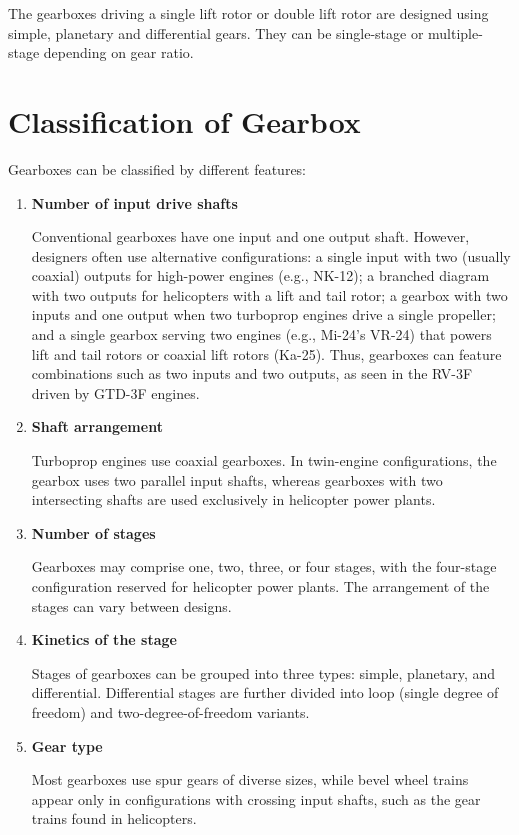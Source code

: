     The gearboxes driving a single lift rotor or double lift rotor are designed using simple, planetary and 
    differential gears. They can be single-stage or multiple-stage depending on gear ratio.

\section{Classification of Gearbox}
    Gearboxes can be classified by different features: 
		\begin{enumerate}
			\item \textbf{Number of input drive shafts}\par
            Conventional gearboxes have one input and one output shaft. However, designers often use alternative 
            configurations: a single input with two (usually coaxial) outputs for high-power engines (e.g., NK-12); 
            a branched diagram with two outputs for helicopters with a lift and tail rotor; a gearbox with two 
            inputs and one output when two turboprop engines drive a single propeller; and a single gearbox serving 
            two engines (e.g., Mi-24's VR-24) that powers lift and tail rotors or coaxial lift rotors (Ka-25). 
            Thus, gearboxes can feature combinations such as two inputs and two outputs, as seen in the RV-3F 
            driven by GTD-3F engines.
			\item \textbf{Shaft arrangement}\par
			Turboprop engines use coaxial gearboxes. In twin-engine configurations, the gearbox uses two parallel 
            input shafts, whereas gearboxes with two intersecting shafts are used exclusively in helicopter power plants.
			\item \textbf{Number of stages}\par
			Gearboxes may comprise one, two, three, or four stages, with the four-stage configuration reserved for 
            helicopter power plants. The arrangement of the stages can vary between designs.
            \item \textbf{Kinetics of the stage}\par
            Stages of gearboxes can be grouped into three types: simple, planetary, and differential. Differential 
            stages are further divided into loop (single degree of freedom) and two-degree-of-freedom variants.
            \item \textbf{Gear type}\par
            Most gearboxes use spur gears of diverse sizes, while bevel wheel trains appear only in configurations 
            with crossing input shafts, such as the gear trains found in helicopters.
		\end{enumerate}

